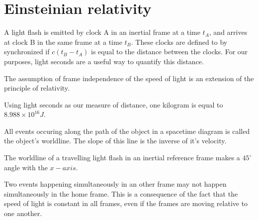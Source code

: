 \documentclass{article}
\begin{document}
\section{Einsteinian relativity}
\begin{definition}
	A light flash is emitted by clock A in an inertial frame at a time \(t_A\), and arrives at clock B in the same frame at a time \(t_B\). These clocks are defined to by synchronized if \(c(t_B-t_A)\) is equal to the distance between the clocks. For our purposes, light seconds are a useful way to quantify this distance.
\end{definition}
\begin{remark}
	The assumption of frame independence of the speed of light is an extension of the principle of relativity.
\end{remark}
\begin{proposition}
	Using light seconds as our measure of distance, one kilogram is equal to \(8.988\times 10^{16}J\).
\end{proposition}
\begin{definition}[Worldline]
	All events occuring along the path of the object in a spacetime diagram is called the object's worldline. The slope of this line is the inverse of it's velocity.
\end{definition}
\begin{remark}
	The worldline of a travelling light flash in an inertial reference frame makes a \(45^{\circ}\) angle with the \(x-axis\).
\end{remark}
\begin{remark}
	Two events happening simultaneously in an other frame may not happen simultaneously in the home frame. This is a consequence of the fact that the speed of light is constant in all frames, even if the frames are moving relative to one another.
\end{remark}
\end{document}
